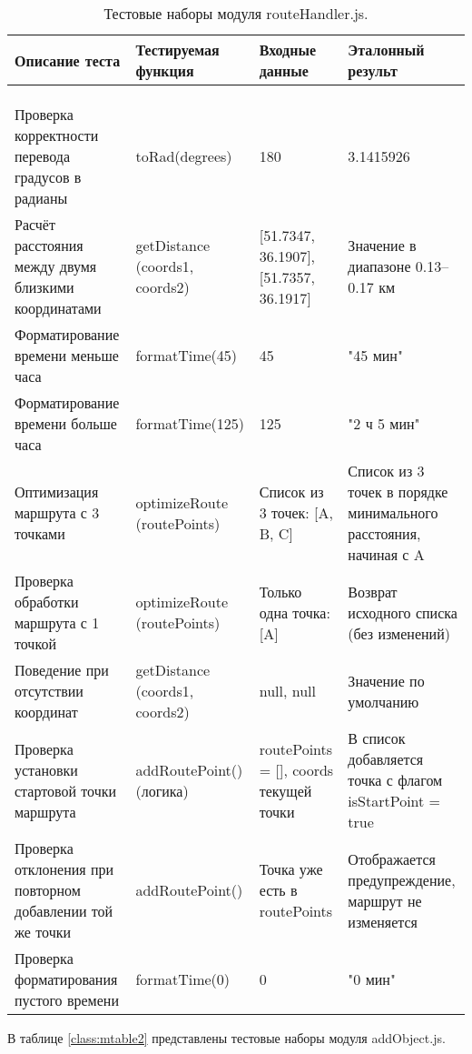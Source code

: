 \renewcommand{\arraystretch}{0.8} %
\begin{xltabular}{\textwidth}{|X|X|X|X|}
	\caption{Тестовые наборы модуля routeHandler.js.\label{class:mtable1}}\\
	\hline \centrow Описание теста & \centrow Тестируемая функция & \centrow Входные данные & \centrow Эталонный результ\\
	\hline {} &  &  & \\ \hline
	\endfirsthead
	\\
	\hline {} &  &  & \\ \hline
	\finishhead
	Проверка корректности перевода градусов в радианы & toRad(degrees) & 180 & 3.1415926\\
	\hline Расчёт расстояния между двумя близкими координатами & getDistance (coords1, coords2) & [51.7347, 36.1907], [51.7357, 36.1917] & Значение в диапазоне 0.13–0.17 км\\
	\hline Форматирование времени меньше часа & formatTime(45) & 45 & "45 мин"\\
	\hline Форматирование времени больше часа & formatTime(125) & 125 & "2 ч 5 мин"\\
	\hline Оптимизация маршрута с 3 точками & optimizeRoute (routePoints) & Список из 3 точек: [A, B, C] & Список из 3 точек в порядке минимального расстояния, начиная с A\\
	\hline Проверка обработки маршрута с 1 точкой & optimizeRoute (routePoints) & Только одна точка: [A] & Возврат исходного списка (без изменений)\\
	\hline Поведение при отсутствии координат & getDistance (coords1, coords2) & null, null & Значение по умолчанию\\
	\hline Проверка установки стартовой точки маршрута & addRoutePoint() (логика) & routePoints = [], coords текущей точки & В список добавляется точка с флагом isStartPoint = true\\
	\hline Проверка отклонения при повторном добавлении той же точки & addRoutePoint() & Точка уже есть в routePoints & Отображается предупреждение, маршрут не изменяется\\
	\hline Проверка форматирования пустого времени & formatTime(0) & 0 & "0 мин"\\
\end{xltabular}

В таблице \ref{class:mtable2} представлены тестовые наборы модуля addObject.js.

